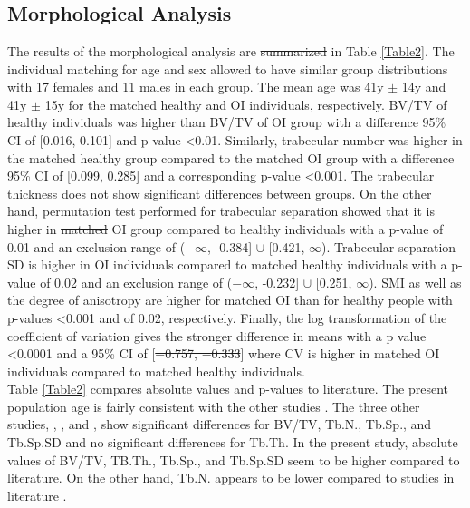 \documentclass[a4paper,fleqn]{DC_ArtStyle}
\providecommand{\DIFadd}[1]{{\protect\color{blue}{#1}}} %
\providecommand{\DIFdel}[1]{{\protect\color{red}\sout{#1}}}                      %
\providecommand{\DIFaddbegin}{} %
\providecommand{\DIFaddend}{} %
\providecommand{\DIFdelbegin}{} %
\providecommand{\DIFdelend}{} %
\begin{document}
\DIFaddbegin \section{\DIFadd{Results}}
\DIFaddend \subsection{Morphological Analysis}
The results of the morphological analysis are \DIFdelbegin \DIFdel{summarized }\DIFdelend \DIFaddbegin \DIFadd{summarised }\DIFaddend in Table \ref{Table2}. The individual matching for age and sex allowed to have similar group distributions with 17 females and 11 males in each group. The mean age was 41y $\pm$ 14y and 41y $\pm$ 15y for the mat\-ched healthy and OI individuals, respectively. BV/TV of healthy individuals was higher than BV/TV of OI group with a difference 95\% CI of [0.016, 0.101] and p-value <0.01. Similarly, trabecular number was higher in the matched healthy group compared to the matched OI group with a difference 95\% CI of [0.099, 0.285] and a corresponding p-value <0.001. The trabecular thickness does not show significant differences between groups. On the other hand, permutation test performed for trabecular separation showed that it is higher in \DIFdelbegin \DIFdel{mat\-ched }\DIFdelend \DIFaddbegin \DIFadd{matched }\DIFaddend OI group compared to healthy individuals with a p-value of 0.01 and an exclusion range of ($-\infty$, -0.384] $\cup$ [0.421, $\infty$). Trabecular separation SD is higher in OI individuals compared to matched healthy individuals with a p-value of 0.02 and an exclusion range of ($-\infty$, -0.232] $\cup$ [0.251, $\infty$). SMI as well as the degree of anisotropy are higher for matched OI than for healthy people with p-values <0.001 and of 0.02, respectively. Finally, the log transformation of the coefficient of variation gives the stronger difference in means with a p value <0.0001 and a 95\% CI of [\DIFdelbegin \DIFdel{−0.757, −0.333}\DIFdelend \DIFaddbegin \DIFadd{-0.757, -0.333}\DIFaddend ] where CV is higher in matched OI individuals compared to matched healthy individuals.\\

Table \ref{Table2} compares absolute values and p-values to literature. The present population age is fairly consistent with the other studies \cite{Folkestad2012,Kocijan2015,Rolvien2018}. The three other studies,  \citeauthor{Folkestad2012}\cite{Folkestad2012}, \citeauthor{Kocijan2015}\cite{Kocijan2015}, and \citeauthor{Rolvien2018}\cite{Rolvien2018}, show significant differences for BV/TV, Tb.N., Tb.Sp., and Tb.Sp.SD and no significant differences for Tb.Th. In the present study, absolute values of BV/TV, TB.Th., Tb.Sp., and Tb.Sp.SD seem to be higher compared to literature. On the other hand, Tb.N. appears to be lower compared to studies in literature \cite{Folkestad2012,Kocijan2015,Rolvien2018}.
\end{document}

